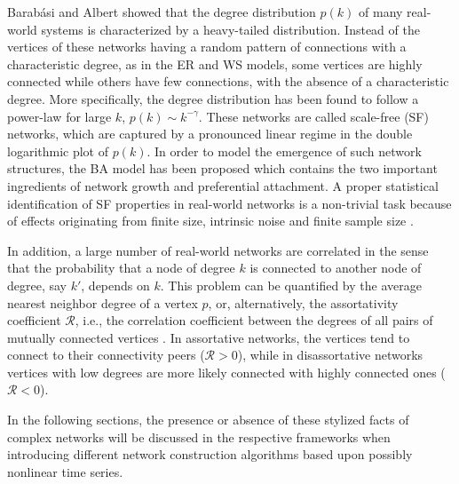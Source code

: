 	Barab\'asi and Albert \cite{Barabasi199} showed that the degree distribution $p(k)$ of many real-world systems is characterized by a heavy-tailed distribution. Instead of the vertices of these networks having a random pattern of connections with a characteristic degree, as in the ER and WS models, some vertices are highly connected while others have few connections, with the absence of a characteristic degree. More specifically, the degree distribution has been found to follow a power-law for large $k$, $p(k) \sim k^{-\gamma}$. These networks are called scale-free (SF) networks, which are captured by a pronounced linear regime in the double logarithmic plot of $p(k)$. In order to model the emergence of such network structures, the BA model has been proposed which contains the two important ingredients of network growth and preferential attachment. A proper statistical identification of SF properties in real-world networks is a non-trivial task because of effects originating from finite size, intrinsic noise and finite sample size \cite{Clauset2009}. 
	
	In addition, a large number of real-world networks are correlated in the sense that the probability that a node of degree $k$ is connected to another node of degree, say $k'$, depends on $k$. This problem can be quantified by the average nearest neighbor degree of a vertex $p$, or, alternatively, the assortativity coefficient $\mathcal{R}$, i.e., the correlation coefficient between the degrees of all pairs of mutually connected vertices \cite{Newman2002}. In assortative networks, the vertices tend to connect to their connectivity peers ($\mathcal{R} > 0$), while in disassortative networks vertices with low degrees are more likely connected with highly connected ones ($\mathcal{R} < 0$). 
	
	In the following sections, the presence or absence of these stylized facts of complex networks will be discussed in the respective frameworks when introducing different network construction algorithms based upon possibly nonlinear time series. 
	
